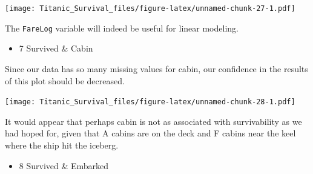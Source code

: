 \documentclass[]{article}
\newenvironment{Shaded}{\begin{snugshade}}{\end{snugshade}}
\newcommand{\KeywordTok}[1]{\textcolor[rgb]{0.13,0.29,0.53}{\textbf{#1}}}
\newcommand{\DataTypeTok}[1]{\textcolor[rgb]{0.13,0.29,0.53}{#1}}
\newcommand{\DecValTok}[1]{\textcolor[rgb]{0.00,0.00,0.81}{#1}}
\newcommand{\StringTok}[1]{\textcolor[rgb]{0.31,0.60,0.02}{#1}}
\newcommand{\CommentTok}[1]{\textcolor[rgb]{0.56,0.35,0.01}{\textit{#1}}}
\newcommand{\OperatorTok}[1]{\textcolor[rgb]{0.81,0.36,0.00}{\textbf{#1}}}
\newcommand{\NormalTok}[1]{#1}
\providecommand{\tightlist}{%
  \setlength{\itemsep}{0pt}\setlength{\parskip}{0pt}}
\begin{document}
\texttt{[image: Titanic\_Survival\_files/figure-latex/unnamed-chunk-27-1.pdf]}

The \texttt{FareLog} variable will indeed be useful for linear modeling.

\begin{itemize}
\tightlist
\item
  7 Survived \& Cabin
\end{itemize}

Since our data has so many missing values for cabin, our confidence in
the results of this plot should be decreased.

\begin{Shaded}
\end{Shaded}

\texttt{[image: Titanic\_Survival\_files/figure-latex/unnamed-chunk-28-1.pdf]}

It would appear that perhaps cabin is not as associated with
survivability as we had hoped for, given that A cabins are on the deck
and F cabins near the keel where the ship hit the iceberg.

\begin{itemize}
\tightlist
\item
  8 Survived \& Embarked
\end{itemize}
\end{document}
